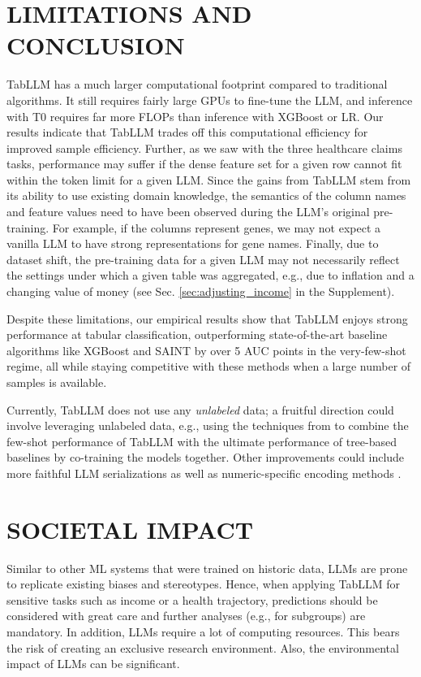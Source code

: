 \section{LIMITATIONS AND CONCLUSION}

TabLLM has a much larger computational footprint compared to traditional algorithms. It still requires fairly large GPUs to fine-tune the LLM, and inference with T0 requires far more FLOPs than inference with XGBoost or LR. Our results indicate that TabLLM trades off this computational efficiency for improved sample efficiency. Further, as we saw with the three healthcare claims tasks, performance may suffer if the dense feature set for a given row cannot fit within the token limit for a given LLM. Since the gains from TabLLM stem from its ability to use existing domain knowledge, the semantics of the column names and feature values need to have been observed during the LLM's original pre-training. For example, if the columns represent genes, we may not expect a vanilla LLM to have strong representations for gene names. Finally, due to dataset shift, the pre-training data for a given LLM may not necessarily reflect the settings under which a given table was aggregated, e.g., due to inflation and a changing value of money (see Sec. \ref{sec:adjusting_income} in the Supplement).

Despite these limitations, our empirical results show that TabLLM enjoys strong performance at tabular classification, outperforming state-of-the-art baseline algorithms like XGBoost and SAINT by over 5 AUC points in the very-few-shot regime, all while staying competitive with these methods when a large number of samples is available.

Currently, TabLLM does not use any \textit{unlabeled} data; a fruitful direction could involve leveraging unlabeled data, e.g., using the techniques from \citet{lang_co-training_2022} to combine the few-shot performance of TabLLM with the ultimate performance of tree-based baselines by co-training the models together. Other improvements could include more faithful LLM serializations as well as numeric-specific encoding methods \citep{gorishniy2022embeddings}.

\section{SOCIETAL IMPACT}

Similar to other ML systems that were trained on historic data, LLMs are prone to replicate existing biases and stereotypes. Hence, when applying TabLLM for sensitive tasks such as income or a health trajectory, predictions should be considered with great care and further analyses (e.g., for subgroups) are mandatory. In addition, LLMs require a lot of computing resources. This bears the risk of creating an exclusive research environment. Also, the environmental impact of LLMs can be significant.


